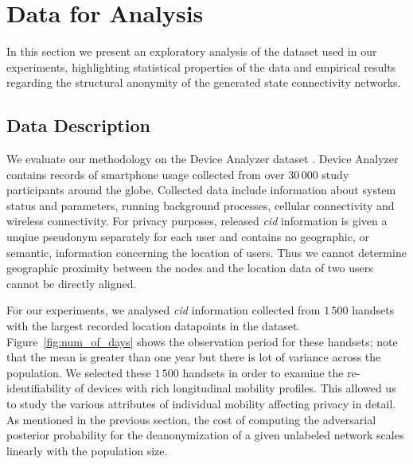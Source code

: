 \section{Data for Analysis}

In this section we present an exploratory analysis of the dataset used in our experiments, highlighting statistical properties of the data and empirical results regarding the structural anonymity of the generated state connectivity networks.

\subsection{Data Description}

We evaluate our methodology on the Device Analyzer dataset \cite{Wagner2014}. Device Analyzer contains records of smartphone usage collected from over $ 30\,000 $  study participants around the globe.
Collected data include information about system status and parameters, running background processes, cellular connectivity and wireless connectivity.
For privacy purposes, released \emph{cid} information is given a unqiue pseudonym separately for each user and contains no geographic, or semantic, information concerning the location of users.
Thus we cannot determine geographic proximity between the nodes and the location data of two users cannot be directly aligned.

For our experiments, we analysed \emph{cid} information collected from $1\,500$ handsets with the largest recorded location datapoints in the dataset.
Figure~\ref{fig:num_of_days} shows the observation period for these handsets; note that the mean is greater than one year but there is lot of variance across the population.
We selected these $1\,500$ handsets in order to examine the re-identifiability of devices with rich longitudinal mobility profiles.
This allowed us to study the various attributes of individual mobility affecting privacy in detail.
As mentioned in the previous section, the cost of computing the adversarial posterior probability for the deanonymization of a given unlabeled network scales linearly with the population size.

